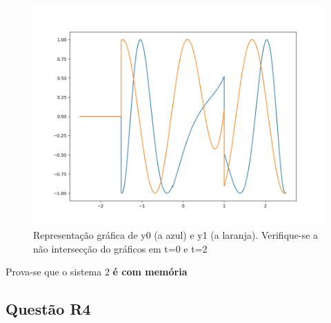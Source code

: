 \documentclass[a4paper,12pt]{article}
\begin{document}
			\begin{figure}[H]
       	 			\centering
        			\captionsetup{justification=centering}
        			\includegraphics[scale=0.35\textscale]{r3graph02.png}
				\caption{Representação gráfica de y0 (a azul) e y1 (a laranja). Verifique-se a não intersecção do gráficos em t=0 e t=2}
			\end{figure}
			Prova-se que o sistema 2 \textbf{é com memória}
		\subsection{Questão R4}
\end{document}
